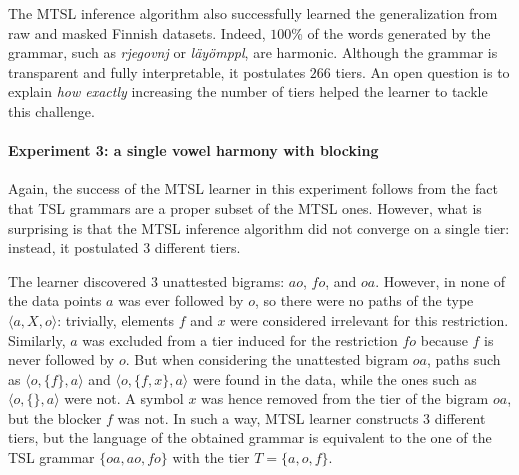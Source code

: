 The MTSL inference algorithm also successfully learned the generalization from raw and masked Finnish datasets.
Indeed, $100$\% of the words generated by the grammar, such as \emph{rjegovnj} or \emph{l\"ay\"omppl}, are harmonic.
Although the grammar is transparent and fully interpretable, it postulates $266$ tiers.
An open question is to explain \emph{how exactly} increasing the number of tiers helped the learner to tackle this challenge.


\begin{table}[h!]
\centering
{}
\caption{MTSL learning of a single harmony without blockers; raw representation.}
\end{table}



\paragraph{Experiment 3: a single vowel harmony with blocking}

Again, the success of the MTSL learner in this experiment follows from the fact that TSL grammars are a proper subset of the MTSL ones.
However, what is surprising is that the MTSL inference algorithm did not converge on a single tier: instead, it postulated $3$ different tiers.

The learner discovered $3$ unattested bigrams: $ao$, $fo$, and $oa$.
However, in none of the data points $a$ was ever followed by $o$, so there were no paths of the type $\langle a, X, o\rangle$: trivially, elements $f$ and $x$ were considered irrelevant for this restriction.
Similarly, $a$ was excluded from a tier induced for the restriction $fo$ because $f$ is never followed by $o$.
But when considering the unattested bigram $oa$, paths such as $\langle o, \{f\}, a\rangle$ and $\langle o, \{f, x\}, a\rangle$ were found in the data, while the ones such as $\langle o, \{\}, a\rangle$ were not.
A symbol $x$ was hence removed from the tier of the bigram $oa$, but the blocker $f$ was not.
In such a way, MTSL learner constructs $3$ different tiers, but the language of the obtained grammar is equivalent to the one of the TSL grammar $\{oa, ao, fo\}$ with the tier $T = \{a, o, f\}$.

